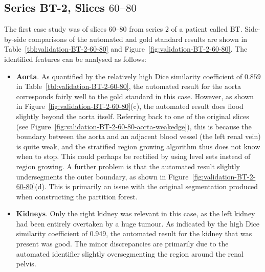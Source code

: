 \subsection{Series BT-2, Slices $60$--$80$}

The first case study was of slices $60$--$80$ from series $2$ of a patient called BT. Side-by-side comparisons of the automated and gold standard results are shown in Table~\ref{tbl:validation-BT-2-60-80} and Figure~\ref{fig:validation-BT-2-60-80}. The identified features can be analysed as follows:
%
\begin{itemize}

\item \textbf{Aorta}. As quantified by the relatively high Dice similarity coefficient of $0.859$ in Table~\ref{tbl:validation-BT-2-60-80}, the automated result for the aorta corresponds fairly well to the gold standard in this case. However, as shown in Figure~\ref{fig:validation-BT-2-60-80}(c), the automated result does flood slightly beyond the aorta itself. Referring back to one of the original slices (see Figure~\ref{fig:validation-BT-2-60-80-aorta-weakedge}), this is because the boundary between the aorta and an adjacent blood vessel (the left renal vein) is quite weak, and the stratified region growing algorithm thus does not know when to stop. This could perhaps be rectified by using level sets instead of region growing. A further problem is that the automated result slightly undersegments the outer boundary, as shown in Figure~\ref{fig:validation-BT-2-60-80}(d). This is primarily an issue with the original segmentation produced when constructing the partition forest.

\item \textbf{Kidneys}. Only the right kidney was relevant in this case, as the left kidney had been entirely overtaken by a huge tumour. As indicated by the high Dice similarity coefficient of $0.949$, the automated result for the kidney that was present was good. The minor discrepancies are primarily due to the automated identifier slightly oversegmenting the region around the renal pelvis.


\end{itemize}
